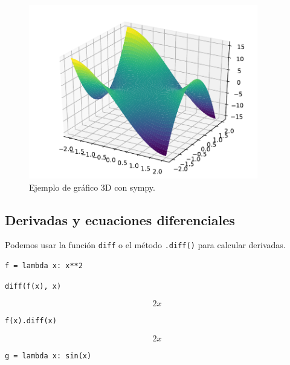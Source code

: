 \begin{figure}[H]
	\centering
	\includegraphics[width=10cm]{img/sympy/sympy_grafico_3D}
	\caption{Ejemplo de gráfico 3D con sympy.}
	\label{fig:grafico_sympy_3D}
\end{figure}

\hypertarget{derivadas-y-ecuaciones-diferenciales}{%
\subsection{Derivadas y ecuaciones
diferenciales}\label{derivadas-y-ecuaciones-diferenciales}}

Podemos usar la función \texttt{diff} o el método \texttt{.diff()} para
calcular derivadas.

\begin{listing}[H]
\begin{verbatim}
f = lambda x: x**2
\end{verbatim}
\end{listing}

\begin{listing}[H]
\begin{verbatim}
diff(f(x), x)
\end{verbatim}
\end{listing}

\[2 x\]

\begin{listing}[H]
\begin{verbatim}
f(x).diff(x)
\end{verbatim}
\end{listing}

\[2 x\]

\begin{listing}[H]
\begin{verbatim}
g = lambda x: sin(x)
\end{verbatim}
\end{listing}

